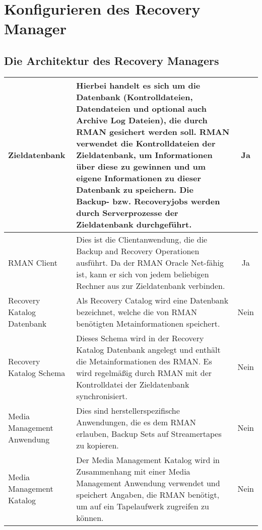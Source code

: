 \chapter{Konfigurieren des Recovery Manager}
\chaptertoc{}
\cleardoubleevenpage

    \section{Die Architektur des Recovery Managers}
        \begin{center}
          \tabletail{%
            \hline
          }
          \begin{small}
            \begin{supertabular}[h]{|p{3cm}|p{10cm}|c|}
              Zieldatenbank & Hierbei handelt es sich um die Datenbank
              (Kontrolldateien, Datendateien und optional auch Archive Log
              Dateien), die durch RMAN gesichert werden soll. RMAN verwendet die
              Kontrolldateien der Zieldatenbank, um Informationen über diese
              zu gewinnen und um eigene Informationen zu dieser Datenbank zu
              speichern. Die Backup- bzw. Recoveryjobs werden durch
              Serverprozesse der Zieldatenbank durchgeführt. & Ja \\
              \hline
              RMAN Client & Dies ist die Clientanwendung, die die Backup and Recovery Operationen ausführt. Da der RMAN Oracle Net-fähig ist, kann er sich von jedem beliebigen Rechner aus zur Zieldatenbank verbinden. & Ja \\
              \hline
              \raggedright Recovery Katalog Datenbank & Als Recovery Catalog wird eine Datenbank bezeichnet, welche die von RMAN benötigten Metainformationen speichert. & Nein \\
              \hline
              \raggedright Recovery Katalog Schema & Dieses Schema wird in der Recovery Katalog Datenbank angelegt und enthält die Metainformationen des RMAN. Es wird regelmäßig durch RMAN mit der Kontrolldatei der Zieldatenbank synchronisiert. & Nein \\
              \hline
              Media Management Anwendung & Dies sind herstellerspezifische Anwendungen, die es dem RMAN erlauben, Backup Sets auf Streamertapes zu kopieren. & Nein \\
              \hline
              Media Management Katalog & Der Media Management Katalog wird in Zusammenhang mit einer Media Management Anwendung verwendet und speichert Angaben, die RMAN benötigt, um auf ein Tapelaufwerk zugreifen zu können. & Nein \\
            \end{supertabular}
          \end{small}
        \end{center}
